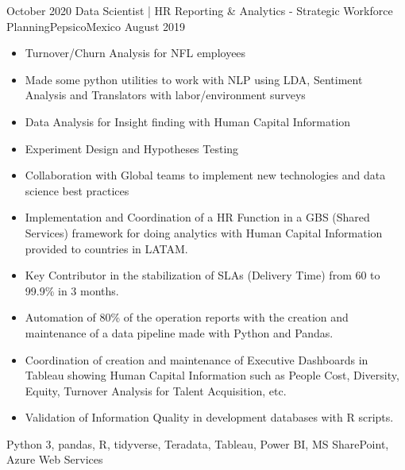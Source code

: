 \begin{experiences}
  \experience
    {October 2020}     {Data Scientist | HR Reporting \& Analytics - Strategic Workforce Planning}{Pepsico}{Mexico}
    {August 2019}    {
                      \begin{itemize}
                        \item Turnover/Churn Analysis for NFL employees
                        \item Made some python utilities to work with NLP using LDA, Sentiment Analysis and Translators with labor/environment surveys                
                        \item Data Analysis for Insight finding with Human Capital Information                   
                        \item Experiment Design and Hypotheses Testing                         
                        \item Collaboration with Global teams to implement new technologies and data science best practices                                                      
                        \item Implementation and Coordination of a HR Function in a GBS (Shared Services) framework for doing analytics with
                        Human Capital Information provided to countries in LATAM.
                        \item Key Contributor in the stabilization of SLAs (Delivery Time) from 60 to 99.9\% in 3 months.
                        \item Automation of 80\% of the operation reports with the creation and maintenance of a data pipeline made with Python and Pandas.
                        \item  Coordination of creation and maintenance of Executive Dashboards in Tableau showing Human Capital Information
                        such as People Cost, Diversity, Equity, Turnover Analysis for Talent Acquisition, etc.
                        \item Validation of Information Quality in development databases with R scripts.
                      \end{itemize}
                    }
                    {Python 3, pandas, R, tidyverse, Teradata, Tableau, Power BI, MS SharePoint, Azure Web Services}
  \emptySeparator
  

\end{experiences}
